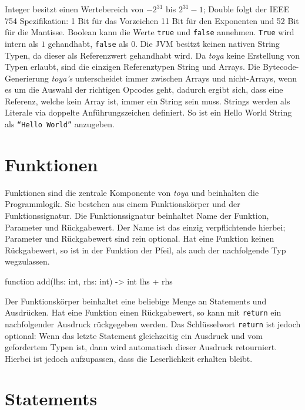 Integer besitzt einen Wertebereich von $-2^{31}$ bis $2^{31} - 1$; Double folgt der IEEE 754 Spezifikation: 1 Bit für das Vorzeichen 11 Bit für den Exponenten und 52 Bit für die Mantisse. Boolean kann die Werte \texttt{true} und \texttt{false} annehmen. \texttt{True} wird intern als $1$ gehandhabt, \texttt{false} als 0. Die JVM besitzt keinen nativen String Typen, da dieser als Referenzwert gehandhabt wird. Da \textit{toya} keine Erstellung von Typen erlaubt, sind die einzigen Referenztypen String und Arrays. Die Bytecode-Generierung \textit{toya's} unterscheidet immer zwischen Arrays und nicht-Arrays, wenn es um die Auswahl der richtigen Opcodes geht, dadurch ergibt sich, dass eine Referenz, welche kein Array ist, immer ein String sein muss. Strings werden als Literale via doppelte Anführungszeichen definiert. So ist ein Hello World String als \texttt{``Hello World''} anzugeben.

\section{Funktionen}

Funktionen sind die zentrale Komponente von \textit{toya} und beinhalten die Programmlogik.
Sie bestehen aus einem Funktionskörper und der Funktionssignatur. Die Funktionssignatur beinhaltet Name der Funktion, Parameter und Rückgabewert. Der Name ist das einzig verpflichtende hierbei; Parameter und Rückgabewert sind rein optional. Hat eine Funktion keinen Rückgabewert, so ist in der Funktion der Pfeil, als auch der nachfolgende Typ wegzulassen.

\begin{ToyaCode}[numbers=none, caption={Eine typische Funktion unter toya.}]
function add(lhs: int, rhs: int) -> int {
    lhs + rhs
}
\end{ToyaCode}

Der Funktionskörper beinhaltet eine beliebige Menge an Statements und Ausdrücken. Hat eine Funktion einen Rückgabewert, so kann mit \texttt{return} ein nachfolgender Ausdruck rückgegeben werden. Das Schlüsselwort \texttt{return} ist jedoch optional: Wenn das letzte Statement gleichzeitig ein Ausdruck und vom gefordertem Typen ist, dann wird automatisch dieser Ausdruck retourniert. Hierbei ist jedoch aufzupassen, dass die Leserlichkeit erhalten bleibt.

\section{Statements}

